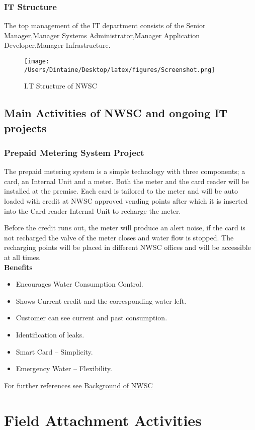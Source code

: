 \documentclass{article}
\begin{document}
\subsubsection{IT Structure}
The top management of the IT department consists of the Senior Manager,Manager Systems Administrator,Manager Application Developer,Manager Infrastructure.
\begin{figure}[H]
\texttt{[image: /Users/Dintaine/Desktop/latex/figures/Screenshot.png]}
\caption{I.T Structure of NWSC}
\label{fig:IT structure}
\end{figure}
\newpage
\subsection{Main Activities of NWSC and ongoing IT projects}
\subsubsection{Prepaid Metering System Project}
The prepaid metering system is a simple technology with three components; a card, an Internal Unit and a meter. Both the meter and the card reader will be installed at the premise. Each card is tailored to the meter and will be auto loaded with credit at NWSC approved vending points after which it is inserted into the Card reader Internal Unit to recharge the meter.
\par Before the credit runs out, the meter will produce an alert noise, if the card is not recharged the valve of the meter closes and water flow is stopped. The recharging points will be placed in different NWSC offices and will be accessible at all times.\\
\textbf{Benefits}
\begin{itemize}
\item Encourages Water Consumption Control.
\item Shows Current credit and the corresponding water left.
\item Customer can see current and past consumption.
\item Identification of leaks.
\item Smart Card – Simplicity.
\item Emergency Water – Flexibility.
\end{itemize}
For further references see \href{https://www.nwsc.co.ug/index.php/about-us}{Background of NWSC} 
\newpage
\section{Field Attachment Activities}
\end{document}
